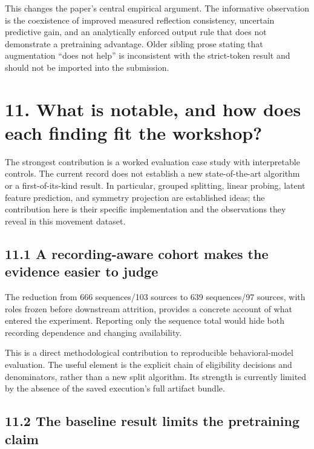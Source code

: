 \documentclass[11pt,letterpaper]{article}
\begin{document}
This changes the paper's central empirical argument. The informative
observation is the coexistence of improved measured reflection
consistency, uncertain predictive gain, and an analytically enforced
output rule that does not demonstrate a pretraining advantage. Older
sibling prose stating that augmentation ``does not help'' is
inconsistent with the strict-token result and should not be imported
into the submission.

\section{11. What is notable, and how does each finding fit the
workshop?}\label{what-is-notable-and-how-does-each-finding-fit-the-workshop}

The strongest contribution is a worked evaluation case study with
interpretable controls. The current record does not establish a new
state-of-the-art algorithm or a first-of-its-kind result. In particular,
grouped splitting, linear probing, latent feature prediction, and
symmetry projection are established ideas; the contribution here is
their specific implementation and the observations they reveal in this
movement dataset.

\subsection{11.1 A recording-aware cohort makes the evidence easier to
judge}\label{a-recording-aware-cohort-makes-the-evidence-easier-to-judge}

The reduction from 666 sequences/103 sources to 639 sequences/97
sources, with roles frozen before downstream attrition, provides a
concrete account of what entered the experiment. Reporting only the
sequence total would hide both recording dependence and changing
availability.

This is a direct methodological contribution to reproducible
behavioral-model evaluation. The useful element is the explicit chain of
eligibility decisions and denominators, rather than a new split
algorithm. Its strength is currently limited by the absence of the saved
execution's full artifact bundle.

\subsection{11.2 The baseline result limits the pretraining
claim}\label{the-baseline-result-limits-the-pretraining-claim}
\end{document}
